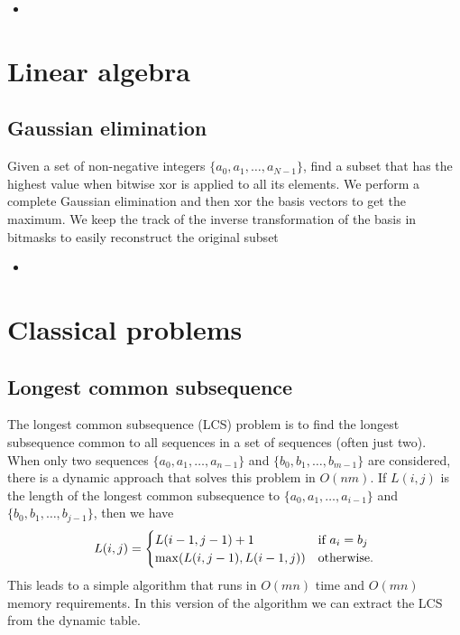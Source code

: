 \documentclass[a4paper, twoside,openany]{book}
\newcommand{\insertcode}[2]{\begin{itemize}\item[]\end{itemize}} %
\begin{document}
\insertcode{"codes/STL.cpp"}{Introduction to STL}

\chapter{Linear algebra}

\section{Gaussian elimination}
Given a set of non-negative integers $\{ a_0, a_1, \ldots, a_{N-1} \}$, find a subset that has the highest value when bitwise xor is applied to all its elements.
We perform a complete Gaussian elimination and then xor the basis vectors to get the maximum.
We keep the track of the inverse transformation of the basis in bitmasks to easily reconstruct the original subset

\insertcode{"codes/maximal_xor.cpp"}{An algorithm to find a subset of a given set with maximal bitwise xor using Gaussian elimintaion.}



\chapter{Classical problems}
\section{Longest common subsequence}
The longest common subsequence (LCS) problem is to find the longest subsequence common to all sequences in a set of sequences (often just two).
When only two sequences $\{ a_0, a_1, \ldots, a_{n-1}\}$ and $\{ b_0, b_1, \ldots, b_{m-1}\}$ are considered, there is a dynamic approach that solves this problem in $O(nm)$.
If $L(i,j)$ is the length of the longest common subsequence to $\{ a_0, a_1, \ldots, a_{i-1}\}$ and $\{ b_0, b_1, \ldots, b_{j-1}\}$, then we have
\begin{equation}
L(i,j) = \begin{cases} L(i-1,j-1) + 1 &  \textnormal{if } a_i = b_j\\ \max(L(i,j-1), L(i-1,j)) & \textnormal{otherwise.} \end{cases}
\end{equation}
This leads to a simple algorithm that runs in $O(mn)$ time and $O(mn)$ memory requirements. In this version of the algorithm we can extract the LCS from the dynamic table.
\end{document}
